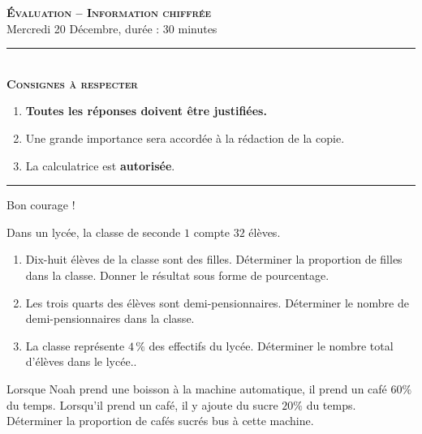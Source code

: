 \documentclass[11pt]{article}
\begin{document}
\begin{center}
\textbf{\LARGE \textsc{Évaluation -- Information chiffrée}}\\[2mm]

{\large Mercredi 20 Décembre, durée : 30 minutes}\\[1mm]
\noindent\rule{8cm}{0.4pt}\\[1mm]
\textbf{\textsc{Consignes à respecter}}
\begin{enumerate}[label=\textbf{\arabic*/}]
\item \textbf{Toutes les réponses doivent être justifiées.}
\item Une grande importance sera accordée à la rédaction de la
  copie.
\item La calculatrice est \textbf{autorisée}.
    \end{enumerate}
\noindent\rule{12cm}{0.4pt}
\end{center}

\begin{center}
  Bon courage !
\end{center}

\begin{exo}
Dans un lycée, la classe de seconde $1$ compte $32$ élèves.

\begin{enumerate}
  \item Dix-huit élèves de la classe sont des filles. Déterminer la proportion
    de filles dans la classe. Donner le résultat sous forme de pourcentage.
  \item Les trois quarts des élèves sont demi-pensionnaires. Déterminer le
    nombre de demi-pensionnaires dans la classe.
  \item La classe représente $4\,\%$ des effectifs du lycée. Déterminer le nombre
    total d'élèves dans le lycée..
\end{enumerate}
\end{exo}

\begin{exo}
Lorsque Noah prend une boisson à la machine automatique, il prend un café $60\%
$ du temps. Lorsqu'il prend un café, il y ajoute du sucre $20\%$ du temps.
Déterminer la proportion de cafés sucrés bus à cette machine.
\end{exo}
\end{document}
